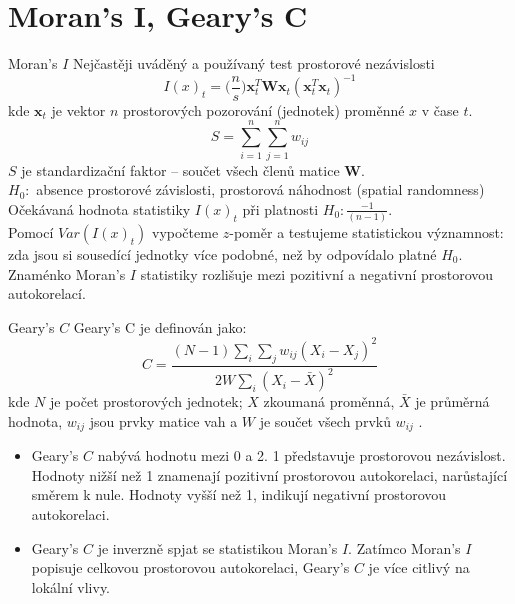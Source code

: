 \documentclass{beamer}
\begin{document}
\section{Moran's I, Geary's C}
\begin{frame}{Moran's $I$}
Nejčastěji uváděný a používaný test prostorové nezávislosti
$$I(x)_t = \big( \frac{n}{s}\big) \bm{x}^T_t \bm{W} \bm{x}_t (\bm{x}_t^T\bm{x}_t)^{-1}$$
kde $\bm{x}_t$ je vektor $n$ prostorových pozorování (jednotek) proměnné $x$ v čase $t$. 
$$S = \sum_{i=1}^n\sum_{j=1}^n w_{ij}$$
$S$ je standardizační faktor – součet všech členů matice $\bm{W}$. \\
$H_0 :$ absence prostorové závislosti, prostorová náhodnost (spatial randomness) \\
Očekávaná hodnota statistiky  $I(x)_t$ při platnosti $H_0 : \frac{-1}{(n-1)} $.\\
Pomocí $Var(I(x)_t)$ vypočteme $z$-poměr a testujeme statistickou významnost: zda jsou si sousedící jednotky více podobné, než by odpovídalo platné $H_0$. \\
Znaménko Moran's $I$ statistiky rozlišuje mezi pozitivní a negativní prostorovou autokorelací.
\end{frame}
\begin{frame}{Geary's $C$}
Geary's C je definován jako:
$$C = \frac{(N-1)\sum_i \sum_j w_{ij} (X_i - X_j)^2}{2W\sum_i (X_i -\bar{X})^2}$$
kde $N$ je počet prostorových jednotek; $X$ zkoumaná proměnná, $\bar{X}$ je průměrná hodnota, $w_{ij}$ jsou prvky matice vah a $W$ je součet všech prvků $w_{ij}$ . 
\begin{itemize}
	\item Geary's $C$ nabývá hodnotu mezi 0 a 2. 1 představuje prostorovou nezávislost. Hodnoty nižší než 1 znamenají pozitivní prostorovou autokorelaci, narůstající směrem k nule. Hodnoty vyšší než 1, indikují negativní prostorovou autokorelaci.
	\item Geary's $C$ je inverzně spjat se statistikou Moran's $I$. Zatímco Moran's $I$ popisuje celkovou prostorovou autokorelaci, Geary's $C$ je více citlivý na lokální vlivy.
\end{itemize}
\end{frame}
\end{document}
